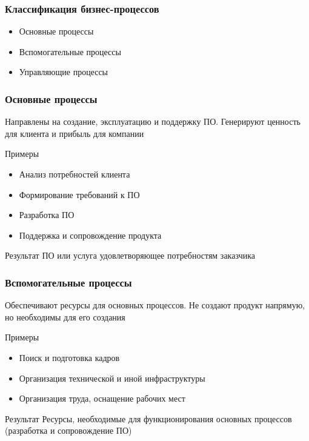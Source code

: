 \documentclass{../industrial-development}
\begin{document}
\begin{frame} \frametitle{Классификация бизнес-процессов}
	\begin{itemize}
		\item Основные процессы
		\item Вспомогательные процессы
		\item Управляющие процессы
	\end{itemize}
\end{frame}
\lecturenotes


\begin{frame} \frametitle{Основные процессы}
	\begin{block}{}
		Направлены на создание, эксплуатацию и поддержку ПО. Генерируют ценность для клиента и прибыль для компании
	\end{block}
	\begin{block}{Примеры}
		\begin{itemize}
			\item Анализ потребностей клиента
			\item Формирование требований к ПО
			\item Разработка ПО
			\item Поддержка и сопровождение продукта
		\end{itemize}
	\end{block}
	\begin{block}{Результат}
		ПО или услуга удовлетворяющее потребностям заказчика
	\end{block}
\end{frame}
\lecturenotes


\begin{frame} \frametitle{Вспомогательные процессы}
	\begin{block}{}
		Обеспечивают ресурсы для основных процессов. Не создают продукт напрямую, но необходимы для его создания
	\end{block}
	\begin{block}{Примеры}
		\begin{itemize}
			\item Поиск и подготовка кадров
			\item Организация технической и иной инфраструктуры
			\item Организация труда, оснащение рабочих мест
		\end{itemize}
	\end{block}
	\begin{block}{Результат}
		Ресурсы, необходимые для функционирования основных процессов (разработка и сопровождение ПО)
	\end{block}
\end{frame}
\lecturenotes
\end{document}
